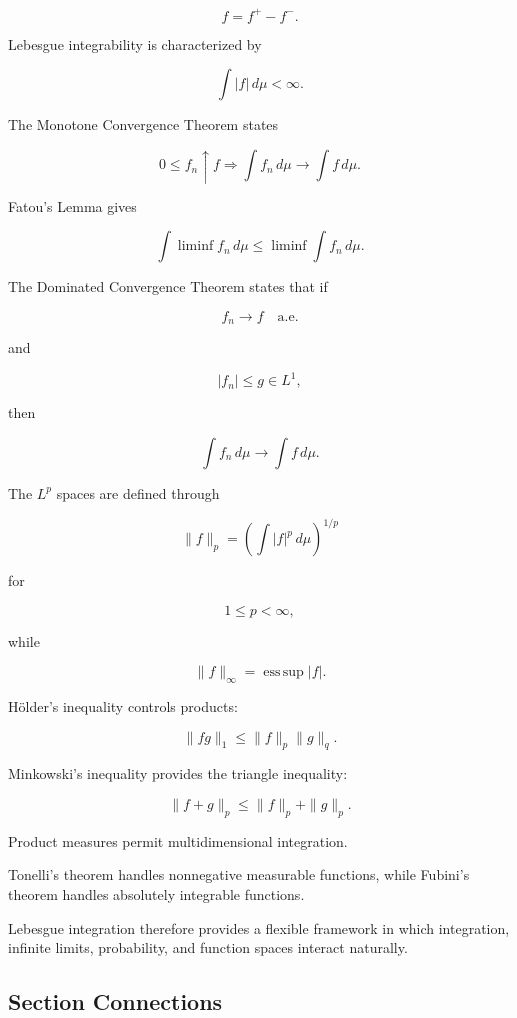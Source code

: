 \[
\boxed{
f=f^+-f^-.
}
\]

Lebesgue integrability is characterized by

\[
\boxed{
\int|f|\,d\mu<\infty.
}
\]

The Monotone Convergence Theorem states

\[
\boxed{
0\leq f_n\uparrow f
\Longrightarrow
\int f_n\,d\mu
\to
\int f\,d\mu.
}
\]

Fatou's Lemma gives

\[
\boxed{
\int\liminf f_n\,d\mu
\leq
\liminf\int f_n\,d\mu.
}
\]

The Dominated Convergence Theorem states that if

\[
f_n\to f
\quad\text{a.e.}
\]

and

\[
|f_n|\leq g\in L^1,
\]

then

\[
\boxed{
\int f_n\,d\mu
\to
\int f\,d\mu.
}
\]

The \(L^p\) spaces are defined through

\[
\boxed{
\|f\|_p
=
\left(
\int|f|^p\,d\mu
\right)^{1/p}
}
\]

for

\[
1\leq p<\infty,
\]

while

\[
\boxed{
\|f\|_\infty
=
\operatorname*{ess\,sup}|f|.
}
\]

H\"older's inequality controls products:

\[
\boxed{
\|fg\|_1
\leq
\|f\|_p\|g\|_q.
}
\]

Minkowski's inequality provides the triangle inequality:

\[
\boxed{
\|f+g\|_p
\leq
\|f\|_p+\|g\|_p.
}
\]

Product measures permit multidimensional integration.

Tonelli's theorem handles nonnegative measurable functions, while Fubini's
theorem handles absolutely integrable functions.

Lebesgue integration therefore provides a flexible framework in which
integration, infinite limits, probability, and function spaces interact
naturally.

\subsection{Section Connections}
\label{subsec:lebesgue-integration-connections}

